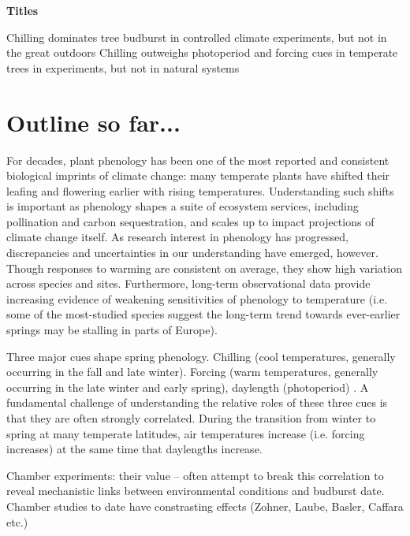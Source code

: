 \documentclass[11pt,letter]{article}
\begin{document}

\renewcommand{\refname}{\CHead{}}


{\bf Titles}

Chilling dominates tree budburst in controlled climate experiments, but not in the great outdoors
Chilling outweighs photoperiod and forcing cues in temperate trees in experiments, but not in natural systems




{
\section{Outline so far...}

For decades, plant phenology has been one of the most reported and consistent biological imprints of climate change: many temperate plants have shifted their leafing and flowering earlier with rising temperatures. Understanding such shifts is important as phenology shapes a suite of ecosystem services, including pollination and carbon sequestration, and scales up to impact projections of climate change itself.  As research interest in phenology has progressed, discrepancies and uncertainties in our understanding have emerged, however. Though responses to warming are consistent on average, they show high variation across species and sites. Furthermore, long-term observational data provide increasing evidence of weakening sensitivities of phenology to temperature (i.e. some of the most-studied species suggest the long-term trend towards ever-earlier springs may be stalling in parts of Europe). 
\par Three major cues shape spring phenology. Chilling (cool temperatures, generally occurring in the fall and late winter). Forcing (warm temperatures, generally occurring in the late winter and early spring), daylength (photoperiod) .  A fundamental challenge of understanding the relative roles of these three cues is that they are often strongly correlated. During the transition from winter to spring at many temperate latitudes, air temperatures increase (i.e. forcing increases) at the same time that daylengths increase. 

\par Chamber experiments: their value --  often attempt to break this correlation to reveal mechanistic links between environmental conditions and budburst date. Chamber studies to date have constrasting effects (Zohner, Laube, Basler, Caffara etc.)
\begin{enumerate}


\end{enumerate}}
\end{document}

